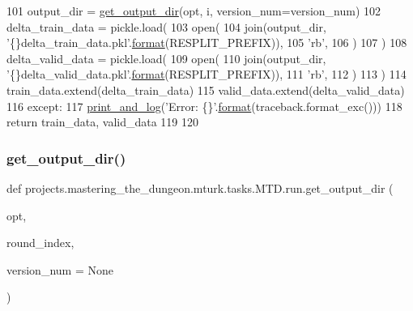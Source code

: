 \begin{DoxyCode}
101             output\_dir = \hyperlink{namespaceprojects_1_1mastering__the__dungeon_1_1mturk_1_1tasks_1_1MTD_1_1run_a7f8196f264013bc16be3e85fe5c68f0d}{get\_output\_dir}(opt, i, version\_num=version\_num)
102             delta\_train\_data = pickle.load(
103                 open(
104                     join(output\_dir, \textcolor{stringliteral}{'\{\}delta\_train\_data.pkl'}.\hyperlink{namespaceparlai_1_1chat__service_1_1services_1_1messenger_1_1shared__utils_a32e2e2022b824fbaf80c747160b52a76}{format}(RESPLIT\_PREFIX)),
105                     \textcolor{stringliteral}{'rb'},
106                 )
107             )
108             delta\_valid\_data = pickle.load(
109                 open(
110                     join(output\_dir, \textcolor{stringliteral}{'\{\}delta\_valid\_data.pkl'}.\hyperlink{namespaceparlai_1_1chat__service_1_1services_1_1messenger_1_1shared__utils_a32e2e2022b824fbaf80c747160b52a76}{format}(RESPLIT\_PREFIX)),
111                     \textcolor{stringliteral}{'rb'},
112                 )
113             )
114             train\_data.extend(delta\_train\_data)
115             valid\_data.extend(delta\_valid\_data)
116         \textcolor{keywordflow}{except}:
117             \hyperlink{namespaceprojects_1_1mastering__the__dungeon_1_1mturk_1_1tasks_1_1MTD_1_1run_acdf4e0fae33f363cf0b352a72788f9bd}{print\_and\_log}(\textcolor{stringliteral}{'Error: \{\}'}.\hyperlink{namespaceparlai_1_1chat__service_1_1services_1_1messenger_1_1shared__utils_a32e2e2022b824fbaf80c747160b52a76}{format}(traceback.format\_exc()))
118     \textcolor{keywordflow}{return} train\_data, valid\_data
119 
120 
\end{DoxyCode}
\mbox{\label{namespaceprojects_1_1mastering__the__dungeon_1_1mturk_1_1tasks_1_1MTD_1_1run_a7f8196f264013bc16be3e85fe5c68f0d}} 
\subsubsection{\texorpdfstring{get\+\_\+output\+\_\+dir()}{get\_output\_dir()}}
{\footnotesize\ttfamily def projects.\+mastering\+\_\+the\+\_\+dungeon.\+mturk.\+tasks.\+M\+T\+D.\+run.\+get\+\_\+output\+\_\+dir (\begin{DoxyParamCaption}\item[{}]{opt,  }\item[{}]{round\+\_\+index,  }\item[{}]{version\+\_\+num = {\ttfamily None} }\end{DoxyParamCaption})}



